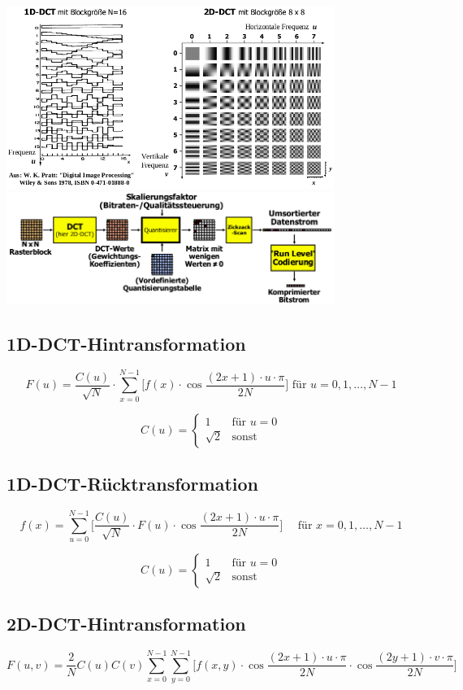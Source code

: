 \includegraphics[width=0.8\textwidth]{dct} \\
\includegraphics[width=0.8\textwidth]{dct_block}

\subsection*{1D-DCT-Hintransformation}
\[
F(u) = \frac{C(u)}{\sqrt{N}}
    \cdot \sum_{x=0}^{N-1} \bigg[ f(x)
    \cdot \cos{\frac{(2x+1) \cdot u \cdot \pi{}}{2N}}
    \bigg] \mbox{  für } u=0,1,\ldots,N-1
\]
    
\[
    C(u) = \begin{cases}
        1 & \text{für } u=0\\
        \sqrt{2} & \text{sonst}
    \end{cases}
\]

\subsection*{1D-DCT-Rücktransformation}
\[
    f(x) = \sum_{u=0}^{N-1} \bigg[ \frac{C(u)}{\sqrt{N}}
    \cdot F(u)
    \cdot \cos{\frac{(2x+1) \cdot u \cdot \pi{}}{2N}}
    \bigg] \quad \mbox{ für } x=0,1,\ldots,N-1
\]
    
\[
    C(u) = \begin{cases}
        1 & \text{für } u=0\\
        \sqrt{2} & \text{sonst}
    \end{cases}
\]

\subsection*{2D-DCT-Hintransformation}
\[
    F(u, v) = \frac{2}{N} C(u) C(v) \sum_{x=0}^{N-1} \sum_{y=0}^{N-1} \bigg[ f(x, y) \cdot 
    \cos \frac{(2x + 1) \cdot u \cdot \pi}{2 N} \cdot \cos \frac{(2y + 1) \cdot v \cdot \pi}{2 N} \bigg]
\]
    
